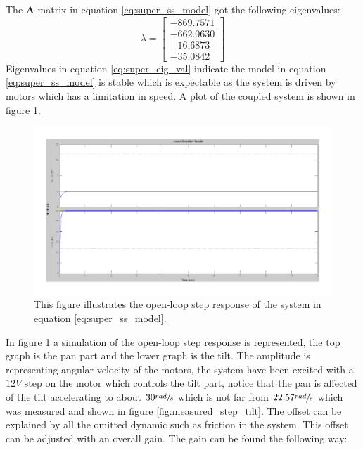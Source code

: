 The \textbf{A}-matrix in equation \ref{eq:super_ss_model} got the following eigenvalues:
\begin{equation}
 \lambda =
 \begin{bmatrix}
   - 869.7571\\
   - 662.0630\\
   - 16.6873\\
   - 35.0842
 \end{bmatrix}\label{eq:super_eig_val}
\end{equation}
Eigenvalues in equation \ref{eq:super_eig_val} indicate the model in equation \ref{eq:super_ss_model} is stable which is expectable as the system is driven by motors which has a limitation in speed. A plot of the coupled system is shown in figure \ref{fig:good_step}.
\begin{figure}[htb]
	\centering
	\includegraphics[width=\textwidth,trim=0 0 0 0]{graphics/GoodSim.pdf} %
	\caption{This figure illustrates the open-loop step response of the system in equation \ref{eq:super_ss_model}.}
	\label{fig:good_step}			%
\end{figure}
In figure \ref{fig:good_step} a simulation of the open-loop step response is represented, the top graph is the pan part and the lower graph is the tilt. The amplitude is representing angular velocity of the motors, the system have been excited with a $12V$ step on the motor which controls the tilt part, notice that the pan is affected of the tilt accelerating to about $30\sfrac{rad}{s}$ which is not far from $22.57\sfrac{rad}{s}$ which was measured and shown in figure \ref{fig:measured_step_tilt}. The offset can be explained by all the omitted dynamic such as friction in the system. This offset can be adjusted with an overall gain. The gain can be found the following way:
